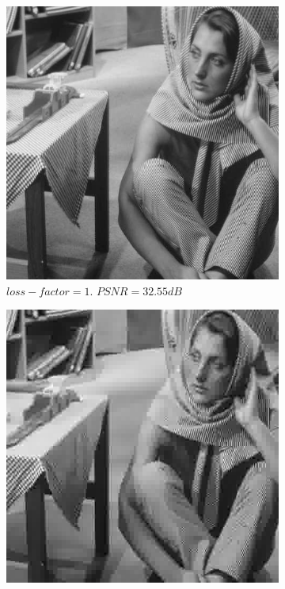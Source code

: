 \documentclass[11pt,a4paper]{article}
\begin{document}
\begin{figure}[ht]
	\centering
	\begin{subfigure}[h]{0.4\textwidth}
		\includegraphics[width=\textwidth]{barbara_lf1}
		\caption{$loss-factor = 1$. $PSNR = 32.55dB$}
		\label{barbara:1}
	\end{subfigure}
	\par\bigskip
	\begin{subfigure}[h]{0.4\textwidth}
		\includegraphics[width=\textwidth]{barbara_lf10}

\end{subfigure}
\end{figure}
\end{document}
